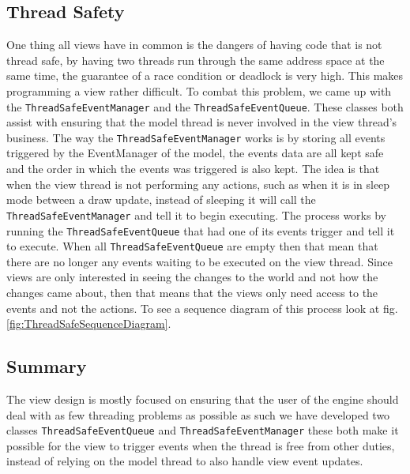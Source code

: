 \subsection*{Thread Safety}

One thing all views have in common is the dangers of having code that
is not thread safe, by having two threads run through the same address
space at the same time, the guarantee of a race condition or deadlock
is very high. This makes programming a view rather difficult. To combat
this problem, we came up with the \texttt{ThreadSafeEventManager}
and the \texttt{ThreadSafeEventQueue}. These classes both assist with
ensuring that the model thread is never involved in the view thread\textquoteright{}s
business. The way the \texttt{ThreadSafeEventManager} works is by
storing all events triggered by the EventManager of the model, the
events data are all kept safe and the order in which the events was
triggered is also kept. The idea is that when the view thread is not
performing any actions, such as when it is in sleep mode between a
draw update, instead of sleeping it will call the \texttt{ThreadSafeEventManager}
and tell it to begin executing. The process works by running the \texttt{ThreadSafeEventQueue}
that had one of its events trigger and tell it to execute. When all
\texttt{ThreadSafeEventQueue} are empty then that mean that there
are no longer any events waiting to be executed on the view thread.
Since views are only interested in seeing the changes to the world
and not how the changes came about, then that means that the views
only need access to the events and not the actions. To see a sequence
diagram of this process look at fig. \ref{fig:ThreadSafeSequenceDiagram}.


\subsection*{Summary}

The view design is mostly focused on ensuring that the user of the
engine should deal with as few threading problems as possible as such
we have developed two classes \texttt{ThreadSafeEventQueue} and \texttt{ThreadSafeEventManager}
these both make it possible for the view to trigger events when the
thread is free from other duties, instead of relying on the model
thread to also handle view event updates. 
